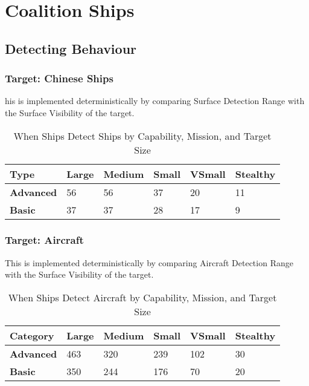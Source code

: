 \documentclass{article}
\begin{document}
\section{Coalition Ships}

\subsection{Detecting Behaviour}
    \subsubsection{Target: Chinese Ships}
            \noindent his is implemented deterministically by comparing Surface Detection Range with the Surface Visibility of the target.
            \begin{table}[h!]
                \centering
                \begin{tabularx}{\textwidth}{|l|X|X|X|X|X|}
                    \hline
                    \textbf{Type} & \textbf{Large} & \textbf{Medium} & \textbf{Small} & \textbf{VSmall} & \textbf{Stealthy} \\
                    \hline
                    \textbf{Advanced} & 56 & 56 & 37 & 20 & 11 \\
                    \hline
                    \textbf{Basic} & 37 & 37 & 28 & 17 & 9 \\
                    \hline
                \end{tabularx}
                \caption{When Ships Detect Ships by Capability, Mission, and Target Size}
                \label{table:CoalitionShipDetectionofShips}
            \end{table}

    \subsubsection{Target: Aircraft}
            \noindent This is implemented deterministically by comparing Aircraft Detection Range with the Surface Visibility of the target.
            \begin{table}[h!]
            \centering
            \begin{tabularx}{\textwidth}{|l|X|X|X|X|X|}
            \hline
            \textbf{Category} & \textbf{Large} & \textbf{Medium} & \textbf{Small} & \textbf{VSmall} & \textbf{Stealthy} \\
            \hline
            \textbf{Advanced} & 463 & 320 & 239 & 102 & 30 \\
            \hline
            \textbf{Basic} & 350 & 244 & 176 & 70 & 20 \\
            \hline
            \end{tabularx}
            \caption{When Ships Detect Aircraft by Capability, Mission, and Target Size}
            \label{table:CoalitionShipDetectionofAircraft}
            \end{table}
\end{document}
